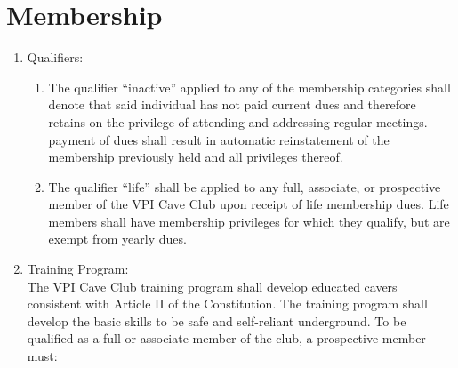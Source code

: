 \documentclass[
]{article}
\providecommand{\tightlist}{%
  \setlength{\itemsep}{0pt}\setlength{\parskip}{0pt}}
\begin{document}
\hypertarget{membership}{%
\section{Membership}\label{membership}}

\begin{enumerate}
\def\labelenumi{\arabic{enumi}.}
\tightlist
\item
  Qualifiers:

  \begin{enumerate}
  \def\labelenumii{\Alph{enumii}.}
  \tightlist
  \item
    The qualifier ``inactive'' applied to any of the membership
    categories shall denote that said individual has not paid current
    dues and therefore retains on the privilege of attending and
    addressing regular meetings. payment of dues shall result in
    automatic reinstatement of the membership previously held and all
    privileges thereof.
  \item
    The qualifier ``life'' shall be applied to any full, associate, or
    prospective member of the VPI Cave Club upon receipt of life
    membership dues. Life members shall have membership privileges for
    which they qualify, but are exempt from yearly dues.
  \end{enumerate}
\item
  Training Program:\\
  The VPI Cave Club training program shall develop educated cavers
  consistent with Article II of the Constitution. The training program
  shall develop the basic skills to be safe and self-reliant
  underground. To be qualified as a full or associate member of the
  club, a prospective member must:


\end{enumerate}
\end{document}
